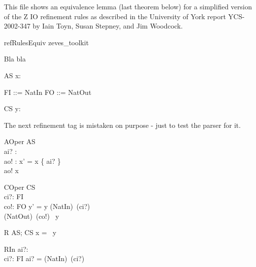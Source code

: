 This file shows an equivalence lemma (last theorem below) for a simplified
version of the Z IO refinement rules as described in the University of York
report YCS-2002-347 by Iain Toyn, Susan Stepney, and Jim Woodcock.

\begin{zsection}
   \SECTION refRulesEquiv \parents zeves\_toolkit
\end{zsection}

Bla bla

\begin{schema}{AS}
   x: \power~\nat
\end{schema}
\begin{zed}
   FI ::= NatIn \ldata \nat \rdata
 \also
   FO ::= NatOut \ldata \nat \rdata
\end{zed}

\begin{schema}{CS}
   y: \seq~\nat
\end{schema}

The next refinement tag is mistaken on purpose - just to test the parser for it.

\begin{schema}{AOper}
   \Delta AS\\
   ai? : \nat\\
   ao! : \nat
\where
   x' = x \cup \{ ai? \}
   \\
   ao! \in x
\end{schema}

\begin{schema}{COper}
   \Delta CS \\
   ci?: FI \\
   co!: FO
\where
   y' = y \cat \langle (NatIn\inv)~(ci?) \rangle \\
   (NatOut\inv)~(co!) \in \ran~y
\end{schema}

\begin{schema}{R}
   AS; CS
\where
   x = \ran~y
\end{schema}

\begin{schema}{RIn}
   ai?: \nat \\
   ci?: FI
\where
   ai? = (NatIn\inv)~(ci?)
\end{schema}


